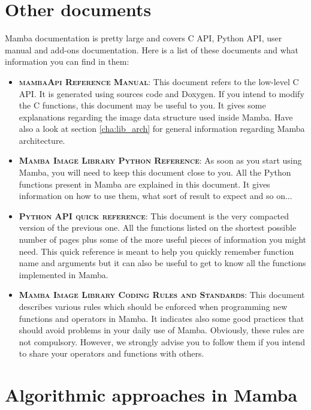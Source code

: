 \documentclass[a4paper,10pt,oneside]{article}
\begin{document}
\pagebreak

\section{Other documents}
\label{cha:other_docs}

Mamba documentation is pretty large and covers C API, Python API, user manual 
and add-ons documentation. Here is a list of these documents and what 
information you can find in them:

\begin{itemize}
\item \textbf{\textsc{mambaApi Reference Manual}}: This document refers to the
low-level C API. It is generated using sources code and Doxygen. If you intend 
to modify the C functions, this document may be useful to you. It gives some
explanations regarding the image data structure used inside Mamba. Have also
a look at section \ref{cha:lib_arch} for general information regarding Mamba
architecture.
\item \textbf{\textsc{Mamba Image Library Python Reference}}: As soon as you
start using Mamba, you will need to keep this document close to you. All the
Python functions present in Mamba are explained in this document. It gives
information on how to use them, what sort of result to expect and so on... 
\item \textbf{\textsc{Python API quick reference}}: This document is the very
compacted version of the previous one. All the functions listed on the shortest
possible number of pages plus some of the more useful pieces of information you
might need. This quick reference is meant to help you quickly remember function
name and arguments but it can also be useful to get to know all the functions
implemented in Mamba.
\item \textbf{\textsc{Mamba Image Library Coding Rules and Standards}}: This
document describes various rules which should be enforced when programming new
functions and operators in Mamba. It indicates also some good practices that
should avoid problems in your daily use of Mamba. Obviously, these rules are not
compulsory. However, we strongly advise you to follow them if you intend to share
your operators and functions with others.
\end{itemize}

\pagebreak

\section{Algorithmic approaches in Mamba}
\end{document}
